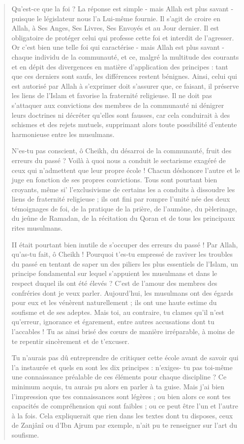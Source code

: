 \begin{quote}
Qu'est-ce que la foi ? La réponse est simple - mais Allah est plus
savant - puisque le législateur nous l'a Lui-même fournie. Il s'agit de
croire en Allah, à Ses Anges, Ses Livres, Ses Envoyés et au Jour
dernier. Il est obligatoire de protéger celui qui professe cette foi et
interdit de l'agresser. Or c'est bien une telle foi qui caractérise -
mais Allah est plus savant - chaque individu de la communauté, et ce,
malgré la multitude des courants et en dépit des divergences en matière
d'application des principes : tant que ces derniers sont saufs, les
différences restent bénignes. Ainsi, celui qui est autorisé par Allah à
s'exprimer doit s'assurer que, ce faisant, il préserve les liens de
l'Islam et favorise la fraternité religieuse. Il ne doit pas s'attaquer
aux convictions des membres de la communauté ni dénigrer leurs doctrines
ni décréter qu'elles sont fausses, car cela conduirait à des schismes et
des rejets mutuels, supprimant alors toute possibilité d'entente
harmonieuse entre les musulmans.

N'es-tu pas conscient, ô Cheikh, du désarroi de la communauté, fruit des
erreurs du passé ? Voilà à quoi nous a conduit le sectarisme exagéré de
ceux qui n'admettent que leur propre école ! Chacun déshonore l'autre et
le juge en fonction de ses propres convictions. Tous sont pourtant bien
croyants, même si' l'exclusivisme de certains les a conduits à dissoudre
les liens de fraternité religieuse ; ils ont fini par rompre l'unité née
des deux témoignages de foi, de la pratique de la prière, de l'aumône,
du pèlerinage, du jeûne de Ramadan, de la récitation du Qoran et de tous
les principaux rites musulmans.

II était pourtant bien inutile de s'occuper des erreurs du passé ! Par
Allah, qu'as-tu fait, ô Cheikh ! Pourquoi t'es-tu empressé de raviver
les troubles du passé en tentant de saper un des piliers les plus
essentiels de l'Islam, un principe fondamental sur lequel s'appuient les
musulmans et dans le respect duquel ils ont été élevés ? C'est de
l'amour des membres des confréries dont je veux parler. Aujourd'hui, les
musulmans ont des égards pour eux et les vénèrent naturellement ; ils
ont une haute estime du soufisme et de ses adeptes. Mais toi, au
contraire, tu clames qu'il n'est qu'erreur, ignorance et égarement,
entre autres accusations dont tu l'accables ! Tu as ainsi brisé des
cœurs de manière irréparable, à moins de te repentir sincèrement et de
t'excuser.

Tu n'aurais pas dû entreprendre de critiquer cette école avant de savoir
qui l'a instaurée et quels en sont les dix principes : n'exiges- tu pas
toi-même une connaissance préalable de ces éléments pour chaque
discipline ? Ce minimum acquis, tu aurais pu alors en parler à ta guise.
Mais j'ai bien l'impression que tes connaissances sont légères ; ou bien
alors ce sont tes capacités de compréhension qui sont faibles ; ou ce
peut être l'un et l'autre à la fois. Cela expliquerait que rien dans les
textes dont tu disposes, ceux de Zanjânî ou d'Ibn Ajrum par exemple,
n'ait pu te renseigner sur l'art du soufisme.


\end{quote}
